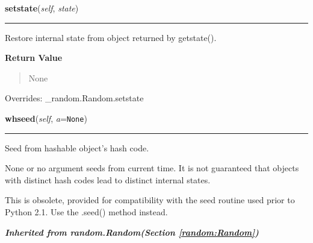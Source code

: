     \vspace{0.5ex}

\hspace{.8\funcindent}\begin{boxedminipage}{\funcwidth}

    \raggedright \textbf{setstate}(\textit{self}, \textit{state})

    \vspace{-1.5ex}

    \rule{\textwidth}{0.5\fboxrule}
\setlength{\parskip}{2ex}
    Restore internal state from object returned by getstate().

\setlength{\parskip}{1ex}
      \textbf{Return Value}
    \vspace{-1ex}

      \begin{quote}
      None

      \end{quote}

      Overrides: \_random.Random.setstate

    \end{boxedminipage}

    \label{random:WichmannHill:whseed}

    \vspace{0.5ex}

\hspace{.8\funcindent}\begin{boxedminipage}{\funcwidth}

    \raggedright \textbf{whseed}(\textit{self}, \textit{a}={\tt None})

    \vspace{-1.5ex}

    \rule{\textwidth}{0.5\fboxrule}
\setlength{\parskip}{2ex}
    Seed from hashable object's hash code.

    None or no argument seeds from current time.  It is not guaranteed that
    objects with distinct hash codes lead to distinct internal states.

    This is obsolete, provided for compatibility with the seed routine used
    prior to Python 2.1.  Use the .seed() method instead.

\setlength{\parskip}{1ex}
    \end{boxedminipage}


\large{\textbf{\textit{Inherited from random.Random\textit{(Section \ref{random:Random})}}}}

